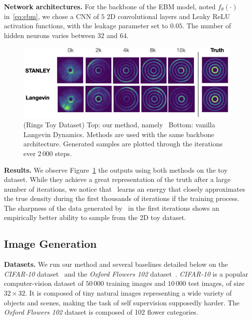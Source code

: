 \documentclass{article} %
\begin{document}
\textbf{Network architectures.} 
For the backbone of the EBM model, noted $f_\theta(\cdot)$ in~\eqref{eq:ebm}, we chose a CNN of $5$ 2D convolutional layers and Leaky ReLU activation functions, with the leakage parameter set to $0.05$.
The number of hidden neurons varies between $32$ and $64$.


\begin{figure}[H]
\includegraphics[width=1.02\linewidth]{figs/rings}
   \caption{(Rings Toy Dataset) Top: our method, namely \algo\ Bottom: vanilla Langevin Dynamics. 
   Methods are used with the same backbone architecture. Generated samples are plotted through the iterations ever $2\,000$ steps.}
\label{fig:resultstoy}
\end{figure}


\textbf{Results.}  
We observe Figure~\ref{fig:resultstoy} the outputs using both methods on the toy dataset.
While they achieve a great representation of the truth after a large number of iterations, we notice that \algo\ learns an energy that closely approximates the true density during the first thousands of iterations if the training process.
The sharpness of the data generated by \algo\ in the first iterations shows an empirically better ability to sample from the 2D toy dataset.

\subsection{Image Generation}

\quad\textbf{Datasets.}
We run our method and several baselines detailed below on the \textit{CIFAR-10} dataset~\cite{krizhevsky2009learning} and the \emph{Oxford Flowers 102} dataset~\cite{nilsback2008automated}.
\textit{CIFAR-10}  is a popular computer-vision dataset of $50\,000$ training images and $10\,000$ test images, of size $32\times 32$. 
It is composed of tiny natural images representing a wide variety of objects and scenes, making the task of self supervision supposedly harder.
The \emph{Oxford Flowers 102} dataset is composed of 102 flower categories.
\end{document}
